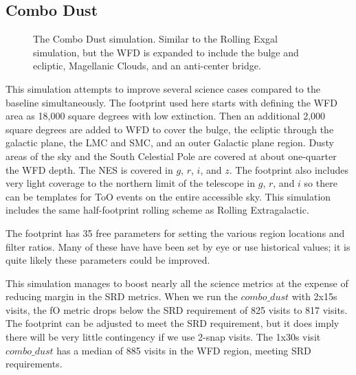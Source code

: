 \subsection{Combo Dust}\label{ss:1.6combodust}

\begin{figure}
\caption{The Combo Dust simulation. Similar to the Rolling Exgal simulation, but the WFD is expanded to include the bulge and ecliptic, Magellanic Clouds, and an anti-center bridge.  }\label{fig:combodust}
\end{figure}


This simulation attempts to improve several science cases compared to the baseline simultaneously. The footprint used here starts with defining the WFD area as 18,000 square degrees with low extinction. Then an additional 2,000 square degrees are added to WFD to cover the bulge, the ecliptic through the galactic plane, the LMC and SMC, and an outer Galactic plane region. Dusty areas of the sky and the South Celestial Pole are covered at about one-quarter the WFD depth. The NES is covered in $g$, $r$, $i$, and $z$. The footprint also includes very light coverage to the northern limit of the telescope in $g$, $r$, and $i$ so there can be templates for ToO events on the entire accessible sky. This simulation includes the same half-footprint rolling scheme as Rolling Extragalactic.

The footprint has 35 free parameters for setting the various region locations and filter ratios. Many of these have have been set by eye or use historical values; it is quite likely these parameters could be improved. 

This simulation manages to boost nearly all the science metrics at the expense of reducing margin in the SRD metrics. When we run the $combo\_dust$ with 2x15s visits, the fO metric drops below the SRD requirement of 825 visits to 817 visits. The footprint can be adjusted to meet the SRD requirement, but it does imply there will be very little contingency if we use 2-snap visits. The 1x30s visit $combo\_dust$ has a median of 885 visits in the WFD region, meeting SRD requirements.

